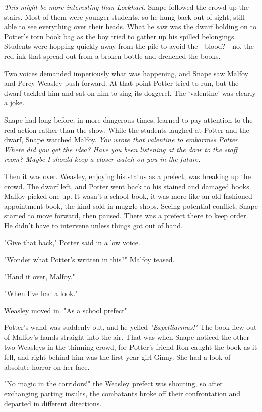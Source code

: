 \emph{This might be more interesting than Lockhart.} Snape followed the crowd up the stairs. Most of them were younger students, so he hung back out of sight, still able to see everything over their heads. What he saw was the dwarf holding on to Potter's torn book bag as the boy tried to gather up his spilled belongings. Students were hopping quickly away from the pile to avoid the - blood? - no, the red ink that spread out from a broken bottle and drenched the books.

Two voices demanded imperiously what was happening, and Snape saw Malfoy and Percy Weasley push forward. At that point Potter tried to run, but the dwarf tackled him and sat on him to sing its doggerel. The `valentine' was clearly a joke.

Snape had long before, in more dangerous times, learned to pay attention to the real action rather than the show. While the students laughed at Potter and the dwarf, Snape watched Malfoy. \emph{You wrote that valentine to embarrass Potter. Where did you get the idea? Have you been listening at the door to the staff room? Maybe I should keep a closer watch on you in the future.}

Then it was over. Weasley, enjoying his status as a prefect, was breaking up the crowd. The dwarf left, and Potter went back to his stained and damaged books. Malfoy picked one up. It wasn't a school book, it was more like an old-fashioned appointment book, the kind sold in muggle shops. Seeing potential conflict, Snape started to move forward, then paused. There was a prefect there to keep order. He didn't have to intervene unless things got out of hand.

"Give that back," Potter said in a low voice.

"Wonder what Potter's written in this?" Malfoy teased.

"Hand it over, Malfoy."

"When I've had a look."

Weasley moved in. "As a school prefect{\el}"

Potter's wand was suddenly out, and he yelled \emph{"Expelliarmus!"} The book flew out of Malfoy's hands straight into the air. That was when Snape noticed the other two Weasleys in the thinning crowd, for Potter's friend Ron caught the book as it fell, and right behind him was the first year girl Ginny. She had a look of absolute horror on her face.

"No magic in the corridors!" the Weasley prefect was shouting, so after exchanging parting insults, the combatants broke off their confrontation and departed in different directions.

